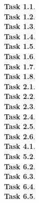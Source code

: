 \documentclass[11pt]{article}
\newcommand{\task}[1]{\clearpage\textbf{Task #1}. \\[0.5em]}
\newcommand{\eeq}{\cong}
\newcommand{\code}[2][]{{\sloppy
\ifmmode
    \text{\lstinline[language=sml,style=15150code,#1]`#2`}
\else
    {\lstinline[language=sml,style=15150code,#1]`#2`}%
\fi}}
\newcommand{\codefile}[2][]{}
\begin{document}





\task{1.1}

\task{1.2}

\task{1.3}

\task{1.4}

\task{1.5}

\task{1.6}

\task{1.7}

\task{1.8}

\task{2.1}

\task{2.2}

\task{2.3}

\task{2.4}

\task{2.5}

\task{2.6}

\task{4.1}

\task{5.2}

\task{6.2}

\task{6.3}

\task{6.4}

\task{6.5}
\end{document}
